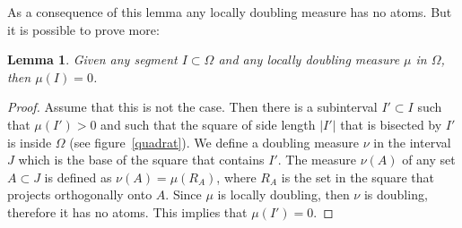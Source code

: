 \documentclass[12pt,twoside,final,psamsfonts]{amsart}
\theoremstyle{plain}
\newtheorem{lema}{Lemma}
\theoremstyle{remark}
\theoremstyle{definition}
\begin{document}
As a consequence of this lemma any locally doubling measure has no atoms. But it
is possible to prove more:
\begin{lema}\label{dos} 
Given any segment $I\subset\Omega$ and any locally doubling measure
$\mu$ in $\Omega$, then $\mu(I)=0$.
\end{lema}
\begin{proof}
Assume that this is not the case. Then there is a subinterval $I'\subset I$ 
such that $\mu(I')>0$ and such that the square
of side length $|I'|$ that is bisected by $I'$ is inside $\Omega$ (see
figure~\ref{quadrat}). 
We define a  doubling 
measure $\nu$ in the interval $J$ which is the base
of the square that contains $I'$. The measure $\nu(A)$ of any set $A\subset J$ 
is defined as
$\nu(A)=\mu(R_A)$, where $R_A$ is the set in the square that projects orthogonally onto
$A$. Since $\mu$ is locally doubling, then $\nu$ is doubling, therefore it has
no atoms. This implies that $\mu(I')=0$.
\end{proof}
\end{document}
